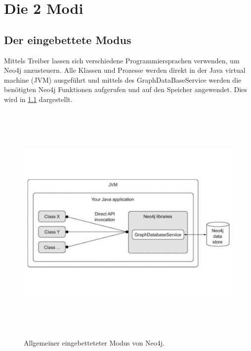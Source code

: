 
\chapter{Die 2 Modi} %

\label{Chapter3} %


\section{Der eingebettete Modus}

Mittels Treiber lassen sich verschiedene Programmiersprachen verwenden, um Neo4j anzusteuern. Alle Klassen und Prozesse werden direkt in der Java virtual machine (JVM) ausgeführt und mittels des GraphDataBaseService  werden die benötigten Neo4j Funktionen aufgerufen und auf den Speicher angewendet. Dies wird in \ref{fig:Embedded} dargestellt.
\begin{figure}[th]
	\centering
	\includegraphics [width=14cm, height=12cm]{Figures/Embedded}
	\caption[Eingebettet]{Allgemeiner eingebetteteter Modus von Neo4j.}
	\label{fig:Embedded}
\end{figure}


